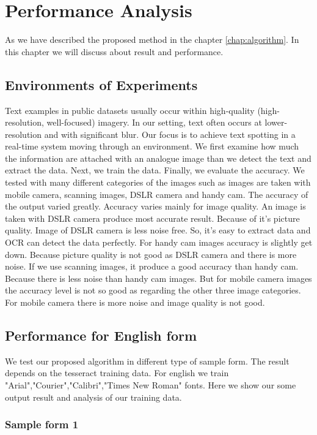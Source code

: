 \chapter {Performance Analysis}
\label{chap:result}
As we have described the proposed method in the chapter \ref{chap:algorithm}. In this chapter we will discuss about result and performance.
\section{Environments of Experiments}
Text examples in public datasets usually occur within high-quality (high-resolution, well-focused) imagery. In our setting, text often occurs at lower-resolution and with significant blur. Our focus is to achieve text spotting in a real-time system moving through an environment. We first examine how much the information are attached with an analogue image than we detect the text and extract the data. Next, we train the data. Finally, we evaluate the accuracy.
We tested with many different categories of the images such as images are taken with mobile camera, scanning images, DSLR camera and handy cam. The accuracy of the output varied greatly. Accuracy varies mainly for image quality. An image is taken with DSLR camera produce most accurate result. Because of it’s picture quality. Image of DSLR camera is less noise free. So, it’s easy to extract data and OCR can detect the data perfectly. For handy cam images accuracy is slightly get down. Because picture quality is not good as DSLR camera and there is more noise.
If we use scanning images, it produce a good accuracy than handy cam. Because there is less noise than handy cam images. But for mobile camera images the accuracy level is not so good as regarding the other three image categories. For mobile camera there is more noise and image quality is not good.   

\section{Performance for English form}
We test our proposed algorithm in different type of sample form. The result depends on the tesseract training data. For english we train "Arial","Courier","Calibri","Times New Roman" fonts. Here we show our some output result and analysis of our training data.
\subsection{Sample form 1}

